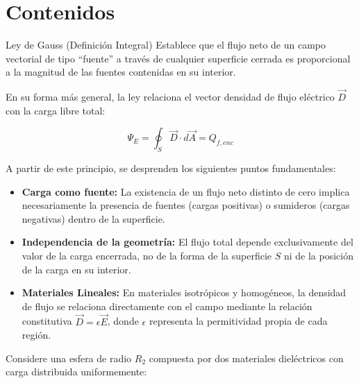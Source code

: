 \documentclass[11pt]{article}
\begin{document}
\crearEncabezado

\section*{Contenidos}

\begin{boxTeoria}{Ley de Gauss (Definición Integral)}
    Establece que el flujo neto de un campo vectorial de tipo ``fuente'' a través de cualquier superficie cerrada es proporcional a la magnitud de las fuentes contenidas en su interior.

    En su forma más general, la ley relaciona el vector densidad de flujo eléctrico $\vec{D}$ con la carga libre total:

    \begin{equation*}
        \Psi_E = \oint_{S} \vec{D} \cdot d\vec{A} = Q_{f, enc}
    \end{equation*}

    A partir de este principio, se desprenden los siguientes puntos fundamentales:
    \begin{itemize}
        \item \textbf{Carga como fuente:} La existencia de un flujo neto distinto de cero implica necesariamente la presencia de fuentes (cargas positivas) o sumideros (cargas negativas) dentro de la superficie.
        \item \textbf{Independencia de la geometría:} El flujo total depende exclusivamente del valor de la carga encerrada, no de la forma de la superficie $S$ ni de la posición de la carga en su interior.
        \item \textbf{Materiales Lineales:} En materiales isotrópicos y homogéneos, la densidad de flujo se relaciona directamente con el campo mediante la relación constitutiva $\vec{D} = \epsilon \vec{E}$, donde $\epsilon$ representa la permitividad propia de cada región.
    \end{itemize}
\end{boxTeoria}

Considere una esfera de radio $R_2$ compuesta por dos materiales dieléctricos con carga distribuida uniformemente: \\[5pt]
\end{document}
